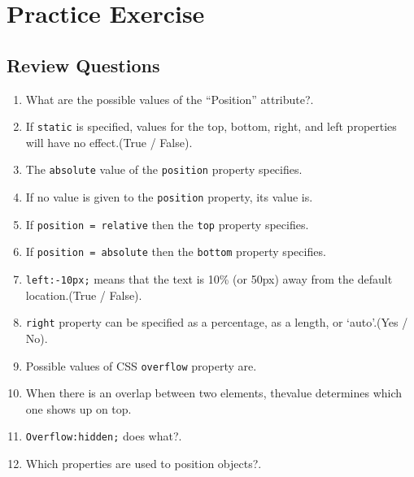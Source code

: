 \documentclass[11pt,a4paper]{article}
\begin{document}
\section*{Practice Exercise}
\subsection*{Review Questions}
\begin{enumerate}\itemsep10pt
\item What are the possible values of the ``Position'' attribute?\underline{\hspace{3cm}}.
\item If \texttt{static} is specified, values for the top, bottom, right, and left properties will have no effect.(True / False)\underline{\hspace{3cm}}.
\item The \texttt{absolute} value of the \texttt{position} property specifies\underline{\hspace{3cm}}.
\item If no value is given to the \texttt{position} property, its value is\underline{\hspace{3cm}}.
\item If \texttt{position = relative} then the \texttt{top} property specifies\underline{\hspace{3cm}}.
\item If \texttt{position = absolute} then the \texttt{bottom} property specifies\underline{\hspace{3cm}}.
\item \texttt{left:-10px;} means that the text is 10\% (or 50px) away from the default location.(True / False)\underline{\hspace{3cm}}.
\item \texttt{right} property can be specified as a percentage, as a length, or `auto'.(Yes / No)\underline{\hspace{3cm}}.
\item Possible values of CSS \texttt{overflow} property are\underline{\hspace{3cm}}.
\item When there is an overlap between two elements, the\underline{\hspace{3cm}}value determines which one shows up on top. 
\item \texttt{Overflow:hidden;} does what?\underline{\hspace{3cm}}.
\item Which properties are used to position objects?\underline{\hspace{3cm}}.

\end{enumerate}
\end{document}
